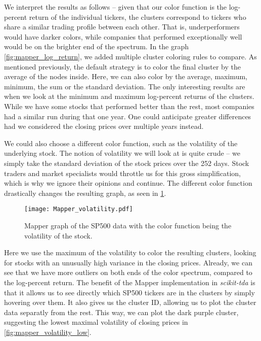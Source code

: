 We interpret the results as follows -- given that our color function is the log-percent return of the individual tickers, the clusters correspond to tickers who share a similar trading profile between each other. That is, underperformers would have darker colors, while companies that performed exceptionally well would be on the brighter end of the spectrum. In the graph \ref{fig:mapper_log_return}, we added multiple cluster coloring rules to compare. As mentioned previously, the default strategy is to color the final cluster by the average of the nodes inside. Here, we can also color by the average, maximum, minimum, the sum or the standard deviation. The only interesting results are when we look at the minimum and maximum log-percent returns of the clusters. While we have some stocks that performed better than the rest, most companies had a similar run during that one year. One could anticipate greater differences had we considered the closing prices over multiple years instead.

We could also choose a different color function, such as the volatility of the underlying stock. The notion of volatility we will look at is quite crude -- we simply take the standard deviation of the stock prices over the 252 days. Stock traders and market specialists would throttle us for this gross simplification, which is why we ignore their opinions and continue. The different color function drastically changes the resulting graph, as seen in \ref{fig:mapper_volatility}.

\begin{figure}[h!]
  \centering
  \texttt{[image: Mapper\_volatility.pdf]}
  \caption{Mapper graph of the SP500 data with the color function being the volatility of the stock.}
  \label{fig:mapper_volatility}
\end{figure}

Here we use the maximum of the volatility to color the resulting clusters, looking for stocks with an unusually high variance in the closing prices. Already, we can see that we have more outliers on both ends of the color spectrum, compared to the log-percent return. The benefit of the Mapper implementation in \textit{scikit-tda} is that it allows us to see directly which SP500 tickers are in the clusters by simply hovering over them. It also gives us the cluster ID, allowing us to plot the cluster data separatly from the rest. This way, we can plot the dark purple cluster, suggesting the lowest maximal volatility of closing prices in \ref{fig:mapper_volatility_low}.

